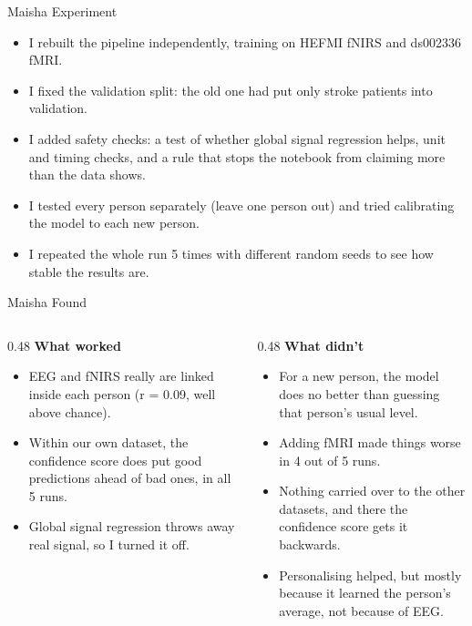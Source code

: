 \documentclass[aspectratio=169,11pt]{beamer}
\newcommand{\colhead}[1]{\textbf{#1}\par\vspace{2pt}}
\begin{document}
\begin{frame}{Maisha Experiment}
\begin{slidebox}
\begin{itemize}\setlength{\itemsep}{5pt}
  \item I rebuilt the pipeline independently, training on HEFMI fNIRS and ds002336 fMRI.
  \item I fixed the validation split: the old one had put only stroke patients into validation.
  \item I added safety checks: a test of whether global signal regression helps, unit and timing checks, and a rule that stops the notebook from claiming more than the data shows.
  \item I tested every person separately (leave one person out) and tried calibrating the model to each new person.
  \item I repeated the whole run 5 times with different random seeds to see how stable the results are.
\end{itemize}
\end{slidebox}
\end{frame}

\begin{frame}{Maisha Found}
\begin{slidebox}
\begin{columns}[T,onlytextwidth]
\begin{column}{0.48\textwidth}
\colhead{What worked}
\begin{itemize}\setlength{\itemsep}{4pt}
  \item EEG and fNIRS really are linked inside each person (r = 0.09, well above chance).
  \item Within our own dataset, the confidence score does put good predictions ahead of bad ones, in all 5 runs.
  \item Global signal regression throws away real signal, so I turned it off.
\end{itemize}
\end{column}
\begin{column}{0.48\textwidth}
\colhead{What didn't}
\begin{itemize}\setlength{\itemsep}{4pt}
  \item For a new person, the model does no better than guessing that person's usual level.
  \item Adding fMRI made things worse in 4 out of 5 runs.
  \item Nothing carried over to the other datasets, and there the confidence score gets it backwards.
  \item Personalising helped, but mostly because it learned the person's average, not because of EEG.
\end{itemize}
\end{column}
\end{columns}
\end{slidebox}
\end{frame}
\end{document}
